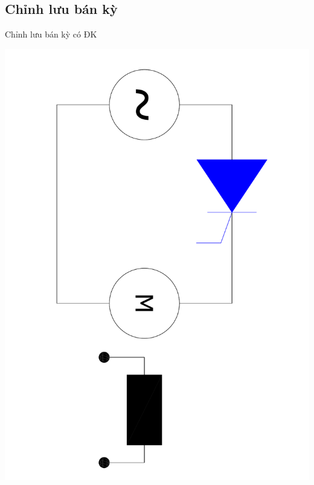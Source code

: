 \documentclass[24pt]{beamer}
\begin{document}
\subsection*{Chỉnh lưu bán kỳ}
\begin{frame}{Chỉnh lưu bán kỳ có ĐK}
	\begin{center}
		\vspace{-1cm}
		\justifying
		\includegraphics[scale=.35, angle=90]{images-chude6/chinh-luu-1pha-co-dieu-khien-tai-motor-DC.pdf} 
	\end{center}
\end{frame}
\end{document}
